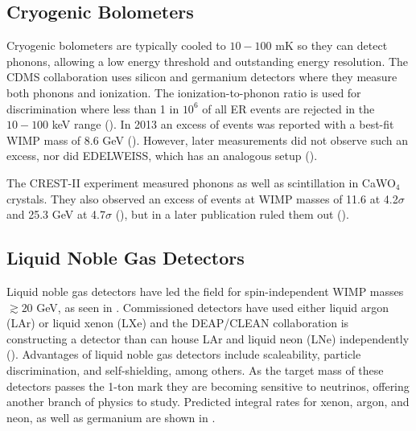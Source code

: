 \subsection{Cryogenic Bolometers}
\label{subsec:bolometers}
Cryogenic bolometers are typically cooled to $10-100$ mK so they can detect phonons, allowing a low energy threshold and
outstanding energy resolution.  The CDMS collaboration uses silicon and germanium detectors where they measure both phonons
and ionization.  The ionization-to-phonon ratio is used for discrimination where less than 1 in $10^{6}$ of all ER events
are rejected in the $10-100$ keV range ().  In 2013 an excess of events was reported with a best-fit
WIMP mass of 8.6 GeV ().  However, later measurements did not observe such an excess, nor did EDELWEISS,
which has an analogous setup ().

The CREST-II experiment measured phonons as well as scintillation in CaWO$_{4}$ crystals.  They also observed an excess of
events at WIMP masses of 11.6 at 4.2$\sigma$ and 25.3 GeV at 4.7$\sigma$ (), but in a later publication
ruled them out ().


\subsection{Liquid Noble Gas Detectors} \label{subsec:noble_gas}
Liquid noble gas detectors have led the field for spin-independent WIMP masses $\gtrsim 20$ GeV, as seen in
.  Commissioned detectors have
used either liquid argon (LAr) or liquid xenon (LXe) and the DEAP/CLEAN collaboration is constructing a detector than can house
LAr and liquid neon (LNe) independently ().  Advantages of liquid noble gas detectors
include scaleability, particle discrimination, and self-shielding, among others.  As the target mass of these detectors passes
the 1-ton mark they are becoming sensitive to neutrinos, offering another branch of physics to study.  Predicted integral rates for xenon,
argon, and neon, as well as germanium are shown in .

